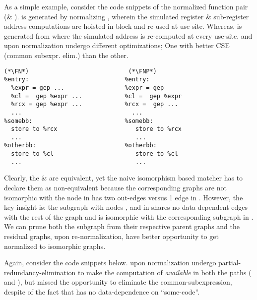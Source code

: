 As a simple example, consider the code snippets of the normalized function pair 
(\FN \& \FNP). \FN is generated by normalizing \F, wherein the  
simulated register \& sub-register address computations  are hoisted in 
 block and 
re-used at use-site. Whereas, \FNP is generated from \FP where the 
simulated address is re-computed 
at every use-site. \F and \FP upon normalization undergo 
different optimizations; One with better CSE (common subexpr. elim.) than 
the other.   
\begin{lstlisting}[style=LLVMWOBORDER]
          (*\FN*)                            (*\FNP*)
%entry:                           %entry:
  %expr = gep ...                 %expr = gep 
  %cl =  gep %expr ...            %cl =  gep %expr 
  %rcx = gep %expr ...            %rcx =  gep ...   
  ...                               ... 
%somebb:                          %somebb:
  store to %rcx                      store to %rcx
  ...                                ...
%otherbb:                         %otherbb:
  store to %cl                       store to %cl  
  ...                                ... 
\end{lstlisting}
Clearly, the  \FN \& \FNP are equivalent, yet the naive isomorphism based 
matcher has to declare them as non-equivalent because the corresponding graphs 
are
not isomorphic with the node  in \GN has two out-edges versus 1 
edge in \GNP. However, the key insight is: the  subgraph with nodes 
, 
 and  in \GNP shares no data-dependent edges with the 
rest of the graph and is isomorphic with the corresponding subgraph in \GN. We 
can prune both the subgraph from their respective parent graphs and the 
residual graphs, upon re-normalization, have better opportunity to get 
normalized to isomorphic graphs.

Again, consider the code snippets below. 
\FP upon normalization undergo 
partial-redundancy-elimination to make the computation of  
\emph{available} in both the paths ( and ), but missed 
 the opportunity to eliminate the common-subexpression, despite of the fact 
 that  has no data-dependence on ``some-code''.      

